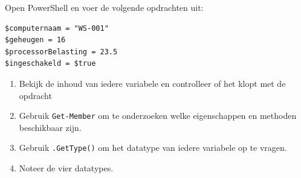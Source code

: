 
Open PowerShell en voer de volgende opdrachten uit:

\begin{lstlisting}
$computernaam = "WS-001"
$geheugen = 16
$processorBelasting = 23.5
$ingeschakeld = $true
\end{lstlisting}

\begin{enumerate}
\item Bekijk de inhoud van iedere variabele en controlleer of het klopt met de opdracht
\item Gebruik \texttt{Get-Member} om te onderzoeken welke eigenschappen en methoden beschikbaar zijn.
\item Gebruik \texttt{.GetType()} om het datatype van iedere variabele op te vragen.
\item Noteer de vier datatypes.
\end{enumerate}

